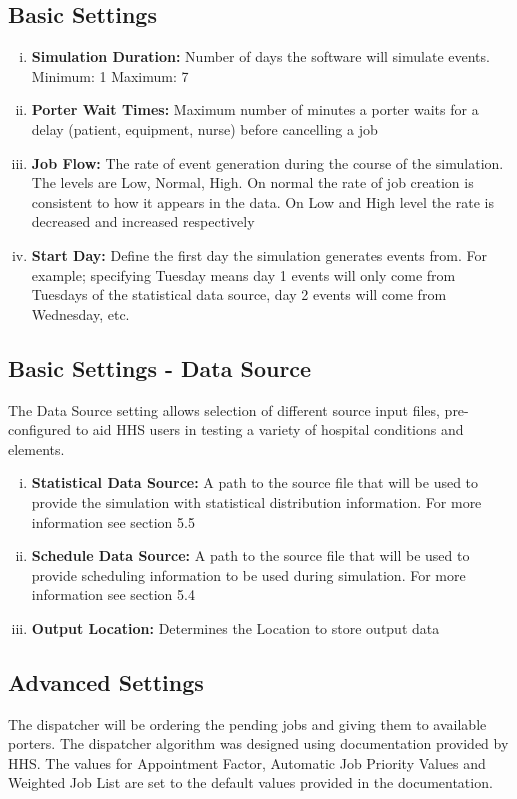 \documentclass[paper=letter, fontsize=10pt]{scrartcl}
\numberwithin{equation}{section}		%
\numberwithin{figure}{section}			%
\numberwithin{table}{section}				%
\begin{document}
	\subsection{Basic Settings}
	\begin{enumerate}[(i)]
		\item \textbf{Simulation Duration:} Number of days the software will simulate events. Minimum: 1 Maximum: 7
		\item \textbf{Porter Wait Times:} Maximum number of minutes a porter waits for a delay (patient, equipment, nurse) before cancelling a job
		\item \textbf{Job Flow:} The rate of event generation during the course of the simulation. The levels are Low, Normal, High. On normal the rate of job creation is consistent to how it appears in the data. On Low and High level the rate is decreased and increased respectively 
		\item \textbf{Start Day:} Define the first day the simulation generates events from. For example; specifying Tuesday means day 1 events will only come from Tuesdays of the statistical data source, day 2 events will come from Wednesday, etc.
	\end{enumerate}
	
	\subsection{Basic Settings - Data Source}
	The Data Source setting allows selection of different source input files, pre-configured to aid HHS users in testing a variety of hospital conditions and elements. 
	\begin{enumerate}[(i)]
		\item \textbf{Statistical Data Source:} A path to the source file that will be used to provide the simulation with statistical distribution information. For more information see section 5.5
		\item \textbf{Schedule Data Source:} A path to the source file that will be used to provide scheduling information to be used during simulation. For more information see section 5.4
		\item \textbf{Output Location:} Determines the Location to store output data
	\end{enumerate}
	
	\subsection{Advanced Settings}
	The dispatcher will be ordering the pending jobs and giving them to available porters.  The dispatcher algorithm was designed using documentation provided by HHS.  The values for Appointment Factor, Automatic Job Priority Values and Weighted Job List are set to the default values provided in the documentation.
	
\end{document}
